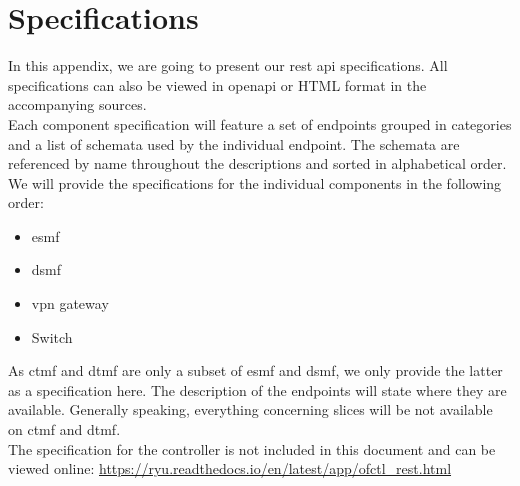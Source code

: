 \chapter{Specifications}
\label{specifications}

In this appendix, we are going to present our \acrshort{rest} \acrshort{api} specifications. All specifications can also be viewed in \Gls{openapi} or HTML format in the accompanying sources.\\

Each component specification will feature a set of endpoints grouped in categories and a list of schemata used by the individual endpoint. The schemata are referenced by name throughout the descriptions and sorted in alphabetical order.\\

We will provide the specifications for the individual components in the following order:

\begin{itemize}
    \item \acrshort{esmf}
    \item \acrshort{dsmf}
    \item \acrshort{vpn} gateway
    \item Switch
\end{itemize}

As \acrshort{ctmf} and \acrshort{dtmf} are only a subset of \acrshort{esmf} and \acrshort{dsmf}, we only provide the latter as a specification here. The description of the endpoints will state where they are available. Generally speaking, everything concerning slices will be not available on \acrshort{ctmf} and \acrshort{dtmf}.\\

The specification for the controller is not included in this document and can be viewed online:
\href{https://ryu.readthedocs.io/en/latest/app/ofctl\_rest.html}{https://ryu.readthedocs.io/en/latest/app/ofctl\_rest.html}

